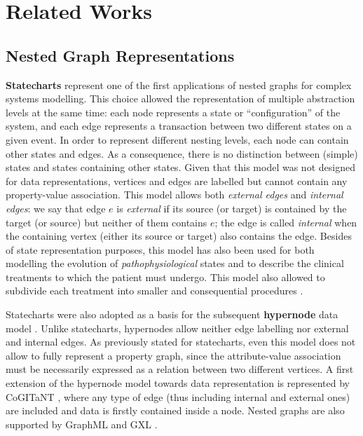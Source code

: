 \section{Related Works}

\subsection{Nested Graph Representations}
\textbf{Statecharts} \cite{statecharts} represent one of the first applications of nested graphs for complex systems modelling. This choice allowed the representation of multiple abstraction levels at the same time: each node represents a  state or ``configuration'' of the system, and each edge represents a transaction between two different states on a given event. In order to represent different nesting levels, each node can contain other states and edges. As a consequence,  there is no distinction between (simple) states and states containing other states. Given that this model was not designed for data representations, vertices and edges are labelled but cannot contain any property-value association. 
This model allows both \textit{external edges} and \textit{internal edges}: we say that edge  $e$ is \textit{external} if its source (or target) is contained by the target (or source) but neither of them contains $e$; the edge is called \textit{internal} when the containing vertex (either its source or target) also contains the edge. Besides of state representation purposes, this model has also been  used for both modelling the evolution of \textit{pathophysiological} states and to describe the clinical treatments to which the patient must undergo. This model also allowed to subdivide each treatment  into smaller and consequential procedures \cite{NestedGlaucoma}.

Statecharts were also adopted as a basis for the subsequent \textbf{hypernode} data model \cite{Poulovassilis1994}. Unlike statecharts, hypernodes allow neither edge labelling nor external and internal edges. As previously stated for statecharts, even this model does not allow to fully represent a property graph, since the attribute-value association must be necessarily expressed as a relation between two different vertices.  A first extension of the hypernode model towards data representation is represented by CoGITaNT \cite{GenestS98}, where any type of edge (thus including internal and external ones) are included and data is firstly contained inside a node. Nested graphs are also supported by GraphML \cite{graphml} and GXL \cite{GXL}.

